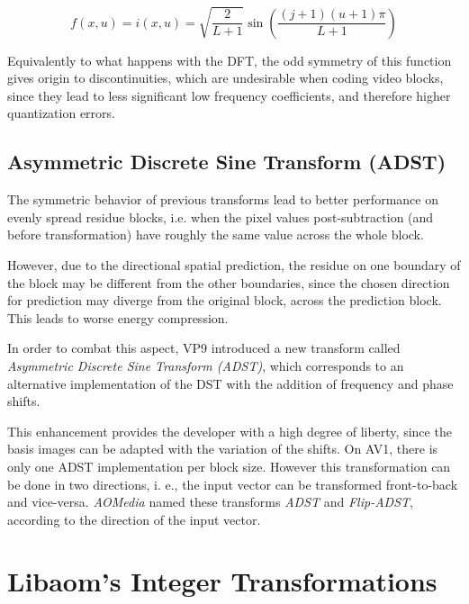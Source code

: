 \begin{equation}
    f(x,u) = i(x,u) = \sqrt{\frac{2}{L+1}}\sin\left(\frac{(j+1)(u+1)\pi}{L+1}\right)
\end{equation}

Equivalently to what happens with the DFT, the odd symmetry of this function gives origin to discontinuities, which are undesirable when coding video blocks, since they lead to less significant low frequency coefficients, and therefore higher quantization errors.

\subsection{Asymmetric Discrete Sine Transform (ADST)}

\nocite{hanButterflyStructuredDesign2013}
\nocite{bingNextgenerationVideoCoding2015}

The symmetric behavior of previous transforms lead to better performance on evenly spread residue blocks, i.e. when the pixel values post-subtraction (and before transformation) have roughly the same value across the whole block.

However, due to the directional spatial prediction, the residue on one boundary of the block may be different from the other boundaries, since the chosen direction for prediction may diverge from the original block, across the prediction block. This leads to worse energy compression.

In order to combat this aspect, VP9 introduced a new transform called \emph{Asymmetric Discrete Sine Transform (ADST)}, which corresponds to an alternative implementation of the DST with the addition of frequency and phase shifts.

This enhancement provides the developer with a high degree of liberty, since the basis images can be adapted with the variation of the shifts. On AV1, there is only one ADST implementation per block size. However this transformation can be done in two directions, i. e., the input vector can be transformed front-to-back and vice-versa. \emph{AOMedia} named these transforms \emph{ADST} and \emph{Flip-ADST}, according to the direction of the input vector.


\section{Libaom's Integer Transformations}
\nocite{soo-changpeiIntegerTransformsAnalogous2000}

